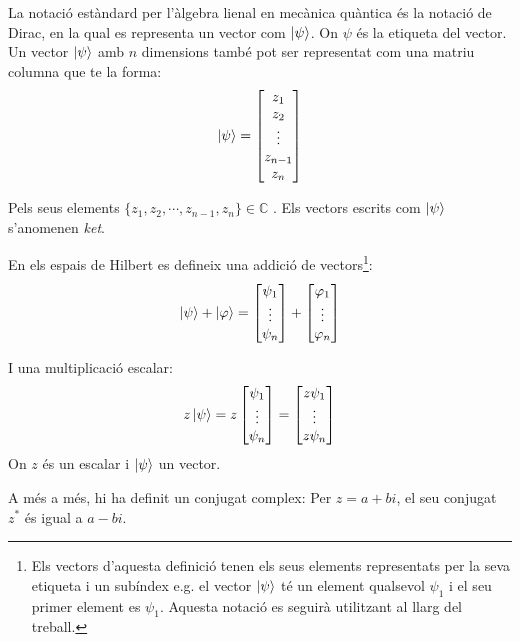 La notació estàndard per l'àlgebra lienal en mecànica quàntica és la notació de Dirac, en la qual es representa un vector com $ \ket{\psi} $. On $\psi$ és la etiqueta del vector. Un vector $ \ket{\psi} $ amb $n$ dimensions també pot ser representat com una matriu columna que te la forma: 
$$
\ket{\psi} = 
\begin{bmatrix}
	z_{1} \\
	z_{2} \\
	\vdots \\
	z_{n-1} \\
	z_{n}
\end{bmatrix}
$$

Pels seus elements $\{z_{1}, z_{2}, \cdots , z_{n-1}, z_{n}\} \in \mathbb{C}$ . Els vectors escrits com $\ket{\psi}$ s'anomenen \textit{ket}.

En els espais de Hilbert es defineix una addició de vectors\footnote{Els vectors d'aquesta definició tenen els seus elements representats per la seva etiqueta i un subíndex e.g. el vector $\ket{\psi}$ té un element qualsevol $\psi_{1}$ i el seu primer element es $\psi_{1}$. Aquesta notació es seguirà utilitzant al llarg del treball.}:
$$
\ket{\psi} + \ket{\varphi} = \begin{bmatrix} \psi_{1} \\ \vdots \\ \psi_{n} \end{bmatrix} +
\begin{bmatrix} \varphi_{1} \\ \vdots \\ \varphi_{n} \end{bmatrix}
$$

I una multiplicació escalar:
$$
  z\ket{\psi} = z\begin{bmatrix} \psi_{1} \\ \vdots \\ \psi_{n} \end{bmatrix} = \begin{bmatrix} z \psi_{1} \\ \vdots \\ z \psi_{n} \end{bmatrix}
$$
On $z$ és un escalar i $\ket{\psi}$ un vector.

A més a més, hi ha definit un conjugat complex: Per $z=a +bi$, el seu conjugat $z^*$ és igual a $a-bi$. 

